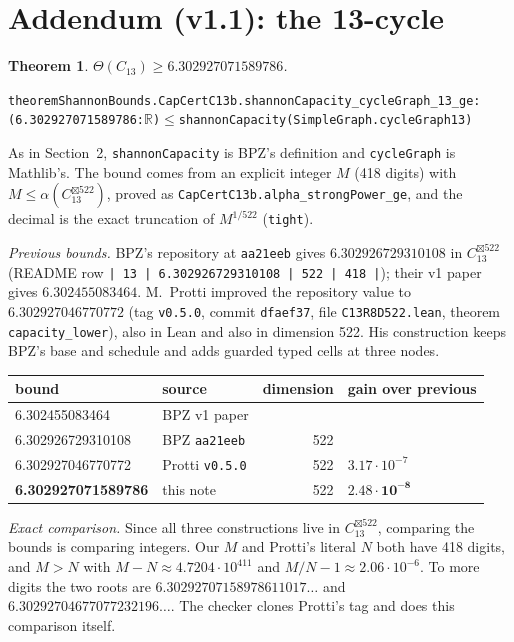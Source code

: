 \documentclass[11pt]{amsart}
\newtheorem{theorem}{Theorem}
\newcommand{\T}{\Theta}
\newcommand{\sbx}{\boxtimes}
\newcommand{\code}[1]{\texttt{#1}}
\begin{document}
\section{Addendum (v1.1): the 13-cycle}\label{sec:c13}

\begin{theorem}
$\T(C_{13})\ge 6.302927071589786$.
\end{theorem}

\begin{alltt}\small
theorem ShannonBounds.CapCertC13b.shannonCapacity_cycleGraph_13_ge :
    (6.302927071589786 : \(\mathbb{R}\)) \(\le\) shannonCapacity (SimpleGraph.cycleGraph 13)
\end{alltt}
As in Section~2, \code{shannonCapacity} is BPZ's definition and \code{cycleGraph} is Mathlib's.
The bound comes from an explicit integer $M$ (418 digits) with $M\le\alpha(C_{13}^{\sbx 522})$,
proved as \code{CapCertC13b.alpha\_strongPower\_ge}, and the decimal is the exact truncation of
$M^{1/522}$ (\code{tight}).

\emph{Previous bounds.} BPZ's repository at \code{aa21eeb} gives $6.302926729310108$ in
$C_{13}^{\sbx 522}$ (README row \code{| 13 | 6.302926729310108 | 522 | 418 |}); their v1 paper
gives $6.302455083464$. M.~Protti \cite{Pro} improved the repository value to
$6.302927046770772$ (tag \code{v0.5.0}, commit \code{dfaef37}, file \code{C13R8D522.lean},
theorem \code{capacity\_lower}), also in Lean and also in dimension 522. His construction keeps
BPZ's base and schedule and adds guarded typed cells at three nodes.

\begin{center}\footnotesize
\begin{tabular}{llrl}
\toprule
bound & source & dimension & gain over previous\\
\midrule
6.302455083464 & BPZ v1 paper & & \\
6.302926729310108 & BPZ \code{aa21eeb} & 522 & \\
6.302927046770772 & Protti \code{v0.5.0} & 522 & $3.17\cdot10^{-7}$\\
\textbf{6.302927071589786} & this note & 522 & $\mathbf{2.48\cdot10^{-8}}$\\
\bottomrule
\end{tabular}
\end{center}

\emph{Exact comparison.} Since all three constructions live in $C_{13}^{\sbx 522}$, comparing
the bounds is comparing integers. Our $M$ and Protti's literal $N$ both have 418 digits, and
$M>N$ with $M-N\approx 4.7204\cdot10^{411}$ and $M/N-1\approx 2.06\cdot10^{-6}$. To more digits
the two roots are $6.30292707158978611017\ldots$ and $6.30292704677077232196\ldots$. The checker
clones Protti's tag and does this comparison itself.
\end{document}
